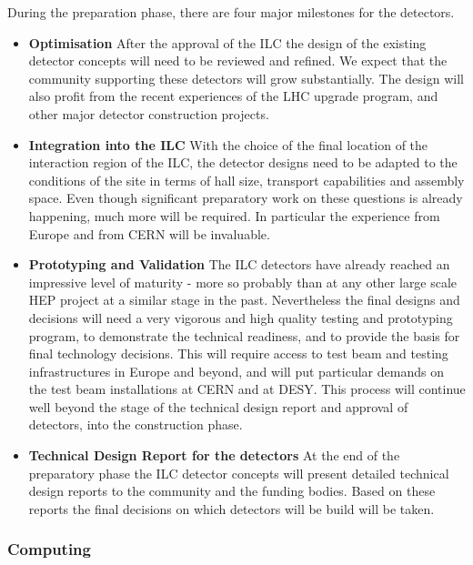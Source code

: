 \documentclass[%
 reprint,
 amsmath,amssymb,
 aps,
]{revtex4-1}
\begin{document}
During the preparation phase, there are four major milestones for the
detectors.
\begin{itemize}

\item{\bfseries Optimisation} After the approval of the ILC the design of the 
existing detector concepts will need to be reviewed and refined. We expect that 
the community supporting these detectors will grow substantially. The design 
will also profit from the recent experiences of the LHC upgrade program, and 
other major detector construction projects. 

\item{\bfseries Integration into the ILC}
With the choice of the final location of the interaction region of the ILC, the 
detector designs need to be adapted to the
conditions of the site in terms of hall size, transport capabilities and
assembly space. Even though significant preparatory work on these questions is 
already happening, much more will be required. In particular the experience from 
Europe and from CERN will be invaluable. 

 
\item{\bfseries Prototyping and Validation}
The ILC detectors have already reached an impressive level of maturity - more so 
probably than at any other large scale HEP project at a similar stage in the 
past. Nevertheless the final designs and decisions will need a very vigorous and 
high quality testing and prototyping program, to demonstrate the technical 
readiness, and to provide the basis for final technology decisions. This will 
require access to test beam and testing infrastructures in Europe and beyond, 
and will put particular demands on the test beam installations at CERN and at 
DESY. This process will continue well beyond the stage of the technical design 
report and approval of detectors, into the construction phase.

\item{\bfseries Technical Design Report for the detectors}
At the end of the preparatory phase the ILC detector concepts will present 
detailed technical design reports to the community and the funding bodies. Based 
on these reports the final decisions on which detectors will be build will be 
taken. 
\end{itemize}

\subsubsection{Computing}
\end{document}
